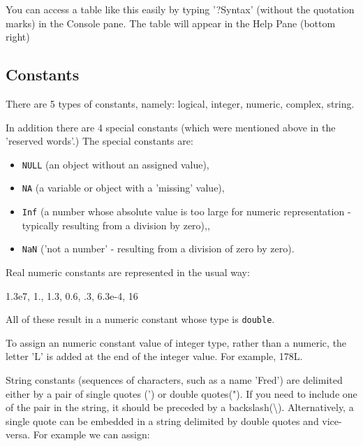 \documentclass[titlepage]{book}\usepackage{knitr}
\begin{document}
You can access a table like this easily by typing '?Syntax' (without the quotation marks) in the Console pane. The table will appear in the Help Pane (bottom right)

\subsection*{Constants}

There are 5 types of constants, namely: logical, integer, numeric, complex, string.

In addition there are 4 special constants (which were mentioned above in the 'reserved words'.) The special constants are:
\begin{itemize}
\item{\texttt{NULL} (an object without an assigned value),}
\item{\texttt{NA} (a variable or object with a 'missing' value),}
\item{\texttt{Inf} (a number whose absolute value is too large for numeric representation - typically resulting from a division by zero),},
\item{\texttt{NaN} ('not a number' - resulting from a division of zero by zero).}
\end{itemize}

Real numeric constants are represented in the usual way:

1.3e7, 1., 1.3, 0.6, .3, 6.3e-4, 16

All of these result in a numeric constant whose type is \texttt{double}.

To assign an numeric constant value of integer type, rather than a numeric, the letter 'L' is added at the end of the integer value. For example, 178L.

String constants (sequences of characters, such as a name 'Fred') are delimited either by a pair of single quotes (') or double quotes("). If you need to include one of the pair in the string, it should be preceded by a backslash(\textbackslash). Alternatively, a single quote can be embedded in a string delimited by double quotes and vice-versa. For example we can assign:


\begin{knitrout}
\color{fgcolor}\begin{kframe}
\begin{alltt}
 \hlkwb{<-} 
 \hlkwb{<-} 
\end{alltt}
\end{kframe}
\end{knitrout}
\end{document}
